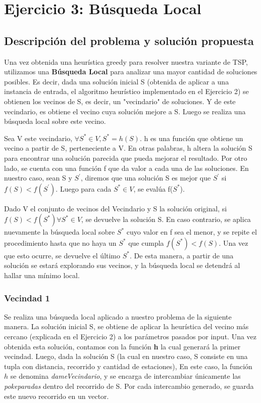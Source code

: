 \section{Ejercicio 3: Búsqueda Local}
	\subsection{Descripción del problema y solución propuesta}

	\par Una vez obtenida una heurística greedy para resolver nuestra variante de TSP, utilizamos una \textbf{Búsqueda Local} para analizar una mayor cantidad de soluciones posibles. Es decir, dada una solución inicial S (obtenida de aplicar a una instancia de entrada, el algoritmo heurístico implementado en el Ejercicio 2) se obtienen los vecinos de S, es decir, un "vecindario" de soluciones. Y de este vecindario, es obtiene el vecino cuya solución mejore a S. Luego se realiza una búsqueda local sobre este vecino. 
	\par Sea V este vecindario, $\forall S^{*}\in V, S^{*} = h(S)$. h es una función que obtiene un vecino a partir de S, perteneciente a V. En otras palabras, h altera la solución S para encontrar una solución parecida que pueda mejorar el resultado. Por otro lado, se cuenta con una función f que da valor a cada una de las soluciones. En nuestro caso, sean S y $S^{'}$, diremos que una solución S es mejor que $S^{'}$ si $f(S) < f(S^{'})$. Luego para cada $S^{*}\in V$, se evalúa f($S^{*}$). 
	\par Dado V el conjunto de vecinos del Vecindario y S la solución original, si $f(S) < f(S^{*}) \forall S^{*}\in V$, se devuelve la solución S. En caso contrario, se aplica nuevamente la búsqueda local sobre $S^{*}$ cuyo valor en f sea el menor, y se repite el procedimiento hasta que no haya un $S^{*}$ que cumpla $f(S^{*}) < f(S)$. Una vez que esto ocurre, se devuelve el último $S^{*}$. De esta manera, a partir de una solución se estará explorando sus vecinos, y la búsqueda local se detendrá al hallar una mínimo local.

    \subsubsection{Vecindad 1}

    \par Se realiza una búsqueda local aplicado a nuestro problema de la siguiente manera. La solución inicial S, se obtiene de aplicar la heurística del vecino más cercano (explicada en el Ejercicio 2) a los parámetros pasados por input. Una vez obtenida esta solución, contamos con la función \textbf{h} la cual generará la primer vecindad. Luego, dada la solución S (la cual en nuestro caso, S consiste en una tupla con distancia, recorrido y cantidad de estaciones), 
	En este caso, la función $h$ se denomina \emph{dameVecindario}, y se encarga de intercambiar únicamente las \emph{pokeparadas} dentro del recorrido de S. Por cada intercambio generado, se guarda este nuevo recorrido en un vector.

